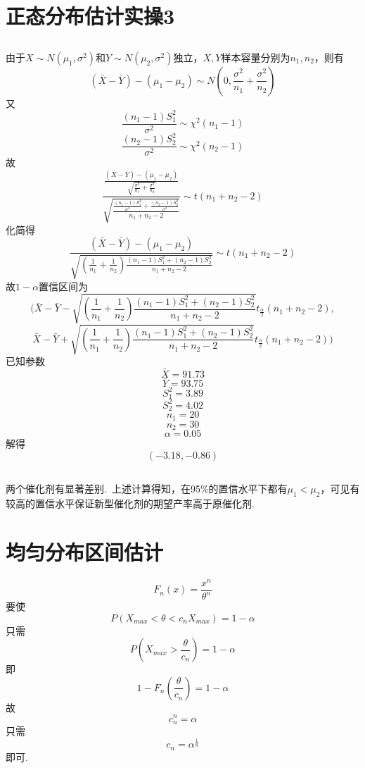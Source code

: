 \documentclass{article}
\begin{document}
\begin{CJK}{UTF8}{gbsn}
\section{正态分布估计实操3}
\subsection{}
由于$X\sim N(\mu_{1},\sigma^{2})$和$Y\sim N(\mu_{2},\sigma^{2})$独立，$X,Y$样本容量分别为$n_{1},n_{2}$，则有
$$ (\bar{X}-\bar{Y})-(\mu_{1}-\mu_{2})\sim N(0,\frac{\sigma^{2}}{n_{1}}+\frac{\sigma^{2}}{n_{2}})$$
又
$$ \frac{(n_{1}-1)S_{1}^{2}}{\sigma^{2}}\sim\chi^{2}(n_{1}-1)$$
$$ \frac{(n_{2}-1)S_{2}^{2}}{\sigma^{2}}\sim\chi^{2}(n_{2}-1)$$
故
$$ \frac{\frac{(\bar{X}-\bar{Y})-(\mu_{1}-\mu_{2})}{\sqrt{\frac{\sigma^{2}}{n_{1}}+\frac{\sigma^{2}}{n_{2}}}}}{\sqrt{\frac{\frac{(n_{1}-1)S_{1}^{2}}{\sigma^{2}}+\frac{(n_{2}-1)S_{2}^{2}}{\sigma^{2}}}{n_{1}+n_{2}-2}}}\sim t(n_{1}+n_{2}-2)$$
化简得
$$ \frac{(\bar{X}-\bar{Y})-(\mu_{1}-\mu_{2})}{\sqrt{(\frac{1}{n_{1}}+\frac{1}{n_{2}})\frac{(n_{1}-1)S_{1}^{2}+(n_{2}-1)S_{2}^{2}}{n_{1}+n_{2}-2}}}\sim t(n_{1}+n_{2}-2)$$
故$1-\alpha$置信区间为
$$ (\bar{X}-\bar{Y}-\sqrt{(\frac{1}{n_{1}}+\frac{1}{n_{2}})\frac{(n_{1}-1)S_{1}^{2}+(n_{2}-1)S_{2}^{2}}{n_{1}+n_{2}-2}}t_{\frac{\alpha}{2}}(n_{1}+n_{2}-2),$$
$$\bar{X}-\bar{Y}+\sqrt{(\frac{1}{n_{1}}+\frac{1}{n_{2}})\frac{(n_{1}-1)S_{1}^{2}+(n_{2}-1)S_{2}^{2}}{n_{1}+n_{2}-2}}t_{\frac{\alpha}{2}}(n_{1}+n_{2}-2))$$
已知参数
$$ \bar{X}=91.73$$
$$ \bar{Y}=93.75$$
$$ S_{1}^{2}=3.89$$
$$ S_{2}^{2}=4.02$$
$$ n_{1}=20$$
$$ n_{2}=30$$
$$ \alpha=0.05$$
解得
$$ (-3.18,-0.86)$$
\subsection{}
两个催化剂有显著差别.\ 上述计算得知，在95\%的置信水平下都有$\mu_{1}<\mu_{2}$，可见有较高的置信水平保证新型催化剂的期望产率高于原催化剂.
\section{均匀分布区间估计}
$$ F_{n}(x)=\frac{x^{n}}{\theta^{n}}$$
要使
$$ P(X_{max}<\theta<c_{n}X_{max})=1-\alpha$$
只需
$$ P(X_{max}>\frac{\theta}{c_{n}})=1-\alpha$$
即
$$ 1-F_{n}(\frac{\theta}{c_{n}})=1-\alpha$$
故
$$ c_{n}^{n}=\alpha $$
只需
$$ c_{n}=\alpha^{\frac{1}{n}}$$
即可.

\end{CJK}
\end{document}
